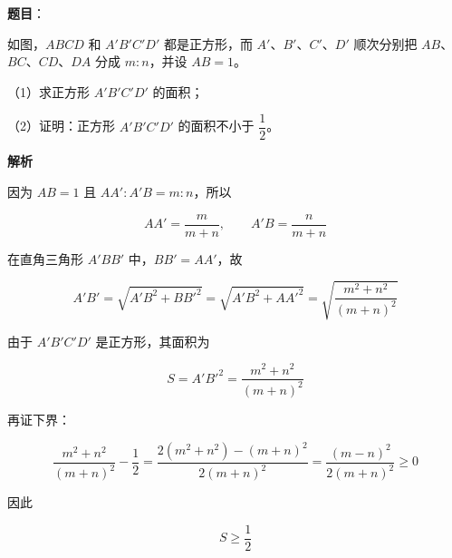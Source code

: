 \begin{answer}

\textbf{题目}：

如图，$ABCD$ 和 $A'B'C'D'$ 都是正方形，而 $A'$、$B'$、$C'$、$D'$ 顺次分别把 $AB$、$BC$、$CD$、$DA$ 分成 $m:n$，并设 $AB=1$。
\nopagebreak[4]
\begin{center}\end{center}
\nopagebreak[4]
（1）求正方形 $A'B'C'D'$ 的面积；

（2）证明：正方形 $A'B'C'D'$ 的面积不小于 $\dfrac12$。

\textbf{解析}

因为 $AB=1$ 且 $AA':A'B=m:n$，所以

\nopagebreak[4]
\[
AA'=\frac{m}{m+n},
\qquad A'B=\frac{n}{m+n}
\]

在直角三角形 $A'BB'$ 中，$BB'=AA'$，故

\nopagebreak[4]
\[
A'B'
=\sqrt{A'B^2+BB'^2}
=\sqrt{A'B^2+AA'^2}
=\sqrt{\frac{m^2+n^2}{(m+n)^2}}
\]

由于 $A'B'C'D'$ 是正方形，其面积为

\nopagebreak[4]
\[
S= A'B'^2=\frac{m^2+n^2}{(m+n)^2}
\]

再证下界：

\nopagebreak[4]
\[
\frac{m^2+n^2}{(m+n)^2}-\frac12
=\frac{2(m^2+n^2)-(m+n)^2}{2(m+n)^2}
=\frac{(m-n)^2}{2(m+n)^2}\ge0
\]

因此

\nopagebreak[4]
\[
S\ge\frac12
\]


\end{answer}

